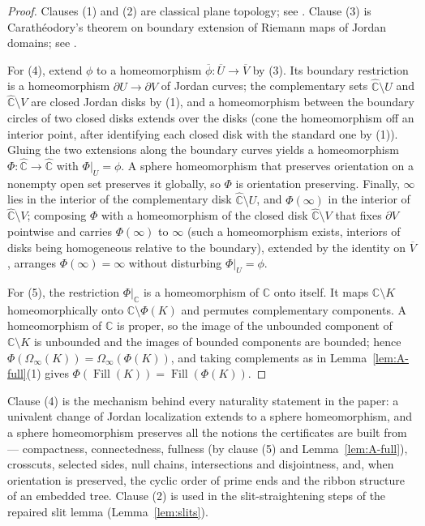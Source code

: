 \documentclass[11pt,reqno]{amsart}
\theoremstyle{definition}
\theoremstyle{remark}
\newcommand{\C}{\mathbb C}
\newcommand{\Chat}{\widehat{\mathbb C}}
\newcommand{\Fill}{\operatorname{Fill}}
\begin{document}
\begin{proof}
Clauses (1) and (2) are classical plane topology; see
\cite{New51,Why42}.  Clause (3) is Carath\'eodory's theorem on boundary
extension of Riemann maps of Jordan domains; see \cite{Pom92}.

For (4), extend $\phi$ to a homeomorphism
$\overline{\phi}\colon\overline{U}\to\overline{V}$ by (3).  Its boundary
restriction is a homeomorphism $\partial U\to\partial V$ of Jordan
curves; the complementary sets $\Chat\setminus U$ and $\Chat\setminus V$
are closed Jordan disks by (1), and a homeomorphism between the boundary
circles of two closed disks extends over the disks (cone the
homeomorphism off an interior point, after identifying each closed disk
with the standard one by (1)).  Gluing the two extensions along the
boundary curves yields a homeomorphism $\Phi\colon\Chat\to\Chat$ with
$\Phi|_U=\phi$.  A sphere homeomorphism that preserves orientation on a
nonempty open set preserves it globally, so $\Phi$ is orientation
preserving.  Finally, $\infty$ lies in the interior of the complementary
disk $\Chat\setminus U$, and $\Phi(\infty)$ in the interior of
$\Chat\setminus V$; composing $\Phi$ with a homeomorphism of the closed
disk $\Chat\setminus V$ that fixes $\partial V$ pointwise and carries
$\Phi(\infty)$ to $\infty$ (such a homeomorphism exists, interiors of
disks being homogeneous relative to the boundary), extended by the
identity on $\overline{V}$, arranges $\Phi(\infty)=\infty$ without
disturbing $\Phi|_U=\phi$.

For (5), the restriction $\Phi|_{\C}$ is a homeomorphism of $\C$ onto
itself.  It maps $\C\setminus K$ homeomorphically onto
$\C\setminus\Phi(K)$ and permutes complementary components.  A
homeomorphism of $\C$ is proper, so the image of the unbounded component
of $\C\setminus K$ is unbounded and the images of bounded components are
bounded; hence $\Phi(\Omega_\infty(K))=\Omega_\infty(\Phi(K))$, and
taking complements as in Lemma~\ref{lem:A-full}(1) gives
$\Phi(\Fill(K))=\Fill(\Phi(K))$.
\end{proof}

Clause (4) is the mechanism behind every naturality statement in the
paper: a univalent change of Jordan localization extends to a sphere
homeomorphism, and a sphere homeomorphism preserves all the notions the
certificates are built from --- compactness, connectedness, fullness (by
clause (5) and Lemma~\ref{lem:A-full}), crosscuts, selected sides, null
chains, intersections and disjointness, and, when orientation is
preserved, the cyclic order of prime ends and the ribbon structure of an
embedded tree.  Clause (2) is used in the slit-straightening steps of the
repaired slit lemma (Lemma~\ref{lem:slits}).
\end{document}
